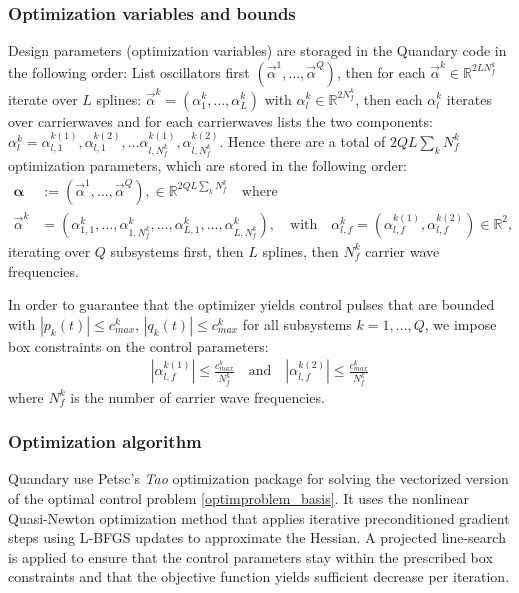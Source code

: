 \documentclass[letterpaper]{article}
\newcommand{\R}{\mathds{R}}
\begin{document}
\subsubsection{Optimization variables and bounds}

Design parameters (optimization variables) are storaged in the Quandary code in the following order: List oscillators first $(\vec{\alpha}^1, \dots, \vec{\alpha}^Q)$, then for each $\vec{\alpha}^k \in
\R^{2LN_f^k}$ iterate over $L$ splines: $\vec{\alpha}^k =
(\alpha^k_1,\dots, \alpha^k_{L})$ with $\alpha^k_l \in \R^{2N_f^k}$, then each
$\alpha^k_l$ iterates over carrierwaves and for each carrierwaves lists
the two components: $\alpha^k_l = \alpha^{k(1)}_{l,1}, \alpha^{k(2)}_{l,1},
\dots \alpha^{k(1)}_{l,N_f^k}, \alpha^{k(2)}_{l,N_f^k}$. Hence there are a total of $2QL\sum_k N_f^k$ optimization parameters, which are stored in the following order:
  \begin{align}
    \boldsymbol{\alpha} &:= \left( \vec{\alpha}^1, \dots, \vec{\alpha}^Q \right), \in
    \mathds{R}^{2QL\sum_k N_f^k} \quad \text{where}\\
    \vec{\alpha}^k &= \left( \alpha_{1,1}^k,\dots, \alpha_{1,N_f^k}^k, \dots,
    \alpha_{L,1}^{k}, \dots, \alpha_{L,N_f^k}^k \right), \quad \text{with} \quad
    \alpha_{l,f}^k = \left(\alpha_{l,f}^{k(1)}, \alpha_{l,f}^{k(2)} \right) \in
    \R^2,
  \end{align}
  iterating over $Q$ subsystems first, then $L$ splines, then $N_f^k$ carrier wave
  frequencies. 

  In order to guarantee that the optimizer yields control pulses that are
  bounded with $|p_k(t)| \leq c^k_{max}$, $|q_k(t)| \leq c^k_{max}$ for all
  subsystems $k=1,\dots, Q$, we impose box constraints on the control
  parameters:
   \begin{align}
     | \alpha_{l,f}^{k(1)}| \leq \frac{c^k_{max}}{N_f^k} \quad \text{and} \quad |
     \alpha_{l,f}^{k(2)} | \leq \frac{c^k_{max}}{N_f^k}
   \end{align}
   where $N_f^k$ is the number of carrier wave frequencies.

  \subsubsection{Optimization algorithm}
    Quandary use Petsc's \textit{Tao} optimization package for solving
    the vectorized version of the optimal control problem
    \eqref{optimproblem_basis}. It uses the nonlinear Quasi-Newton
    optimization method that applies iterative preconditioned gradient steps using L-BFGS updates to approximate the Hessian. A projected line-search is applied to ensure that the control parameters stay within the prescribed box constraints and that the objective function yields sufficient decrease per iteration.
\end{document}
